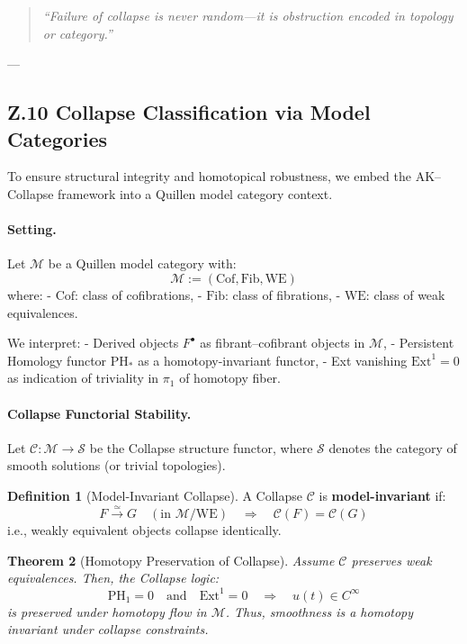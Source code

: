 \documentclass[11pt]{article}
\newtheorem{theorem}{Theorem}[section]
\theoremstyle{definition}
\newtheorem{definition}[theorem]{Definition}
\begin{document}
\begin{quote}
\textit{“Failure of collapse is never random—it is obstruction encoded in topology or category.”}
\end{quote}

---

\subsection*{Z.10 Collapse Classification via Model Categories}

To ensure structural integrity and homotopical robustness, we embed the AK–Collapse framework into a Quillen model category context.

\paragraph{Setting.}
Let $\mathcal{M}$ be a Quillen model category with:
\[
\mathcal{M} := (\text{Cof}, \text{Fib}, \text{WE})
\]
where:
- $\text{Cof}$: class of cofibrations,
- $\text{Fib}$: class of fibrations,
- $\text{WE}$: class of weak equivalences.

We interpret:
- Derived objects $F^\bullet$ as fibrant–cofibrant objects in $\mathcal{M}$,
- Persistent Homology functor $\mathrm{PH}_*$ as a homotopy-invariant functor,
- Ext vanishing $\mathrm{Ext}^1 = 0$ as indication of triviality in $\pi_1$ of homotopy fiber.

\paragraph{Collapse Functorial Stability.}

Let $\mathcal{C} : \mathcal{M} \to \mathcal{S}$ be the Collapse structure functor,  
where $\mathcal{S}$ denotes the category of smooth solutions (or trivial topologies).

\begin{definition}[Model-Invariant Collapse]
A Collapse $\mathcal{C}$ is \textbf{model-invariant} if:
\[
F \xrightarrow{\simeq} G \quad (\text{in } \mathcal{M}/\text{WE}) \quad \Rightarrow \quad
\mathcal{C}(F) = \mathcal{C}(G)
\]
i.e., weakly equivalent objects collapse identically.
\end{definition}

\begin{theorem}[Homotopy Preservation of Collapse]
Assume $\mathcal{C}$ preserves weak equivalences.  
Then, the Collapse logic:
\[
\mathrm{PH}_1 = 0 \quad \text{and} \quad \mathrm{Ext}^1 = 0 \quad \Rightarrow \quad u(t) \in C^\infty
\]
is preserved under homotopy flow in $\mathcal{M}$.  
Thus, smoothness is a homotopy invariant under collapse constraints.
\end{theorem}
\end{document}
